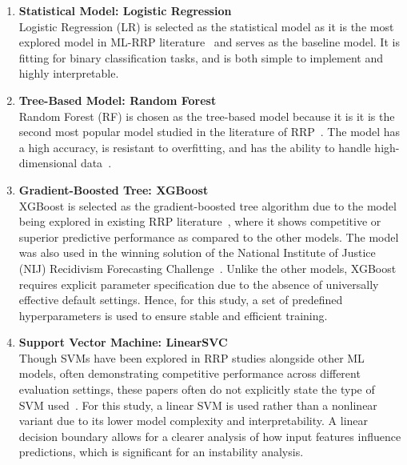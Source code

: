 \documentclass[12pt]{article}
\begin{document}
\begin{enumerate}
 \item \textbf{Statistical Model: Logistic Regression} \\
  \tabto{2em} Logistic Regression (LR) is selected as the statistical model as it is the most explored model in ML-RRP literature~\cite{travaini2022machine} and serves as the baseline model. It is fitting for binary classification tasks, and is both simple to implement and highly interpretable. 

 \item \textbf{Tree-Based Model: Random Forest}\\
  \tabto{2em} Random Forest (RF) is chosen as the tree-based model because it is it is the second most popular model studied in the literature of RRP~\cite{travaini2022machine}. The model has a high accuracy, is resistant to overfitting, and has the ability to handle high-dimensional data~\cite{kovalchuk2023prediction}.

 \item \textbf{Gradient-Boosted Tree: XGBoost}\\
  \tabto{2em} XGBoost is selected as the gradient-boosted tree algorithm due to the model being explored in existing RRP literature~\cite{won2019recidivism,rajendran2021predicting}, where it shows competitive or superior predictive performance as compared to the other models. The model was also used in the winning solution of the National Institute of Justice (NIJ) Recidivism Forecasting Challenge~\cite{han2022xgboost}. Unlike the other models, XGBoost requires explicit parameter specification due to the absence of universally effective default settings. Hence, for this study, a set of predefined hyperparameters is used to ensure stable and efficient training. 

 \item \textbf{Support Vector Machine: LinearSVC}\\
  \tabto{2em} Though SVMs have been explored in RRP studies alongside other ML models, often demonstrating competitive performance across different evaluation settings, these papers often do not explicitly state the type of SVM used~\cite{duwe2017out, tolan2019machine,ozkan2017predicting}. For this study, a linear SVM is used rather than a nonlinear variant due to its lower model complexity and interpretability. A linear decision boundary allows for a clearer analysis of how input features influence predictions, which is significant for an instability analysis. 
  

\end{enumerate}
\end{document}
